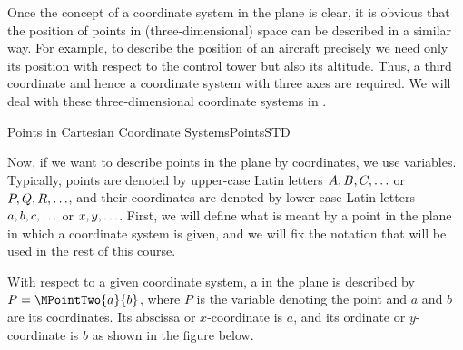 \begin{MIntro}
Once the concept of a coordinate system in the plane is clear, it is obvious that the position of points
in (three-dimensional) space can be described in a similar way. For example, to describe the position of an aircraft precisely we need only its position with respect to the control tower but also its altitude. 
Thus, a third coordinate and hence a coordinate system with three axes are required. We will deal with these three-dimensional coordinate systems 
in .
\end{MIntro}

\begin{MXContent}{Points in Cartesian Coordinate Systems}{Points}{STD}

Now, if we want to describe points in the plane by coordinates, we use variables. 
Typically, points are denoted by upper-case Latin letters $A,B,C,\hdots$ or $P,Q,R,\hdots$, and their coordinates 
are denoted by lower-case Latin letters $a,b,c,\hdots$ or $x,y,\hdots$. First, we will define what is 
meant by a point in the plane in which a coordinate system is given, and we will fix the notation that will be used 
in the rest of this course.

\begin{MInfo}

With respect to a given coordinate system, a  in the plane is described by $P=\MPointTwo{a}{b}$,
where $P$ is the variable denoting the point and $a$ and $b$ are its coordinates. Its abscissa or $x$-coordinate is 
$a$, and its ordinate or $y$-coordinate is $b$ as shown in the figure below.

\begin{center}
\end{center}
\end{MInfo}
\end{MXContent}
